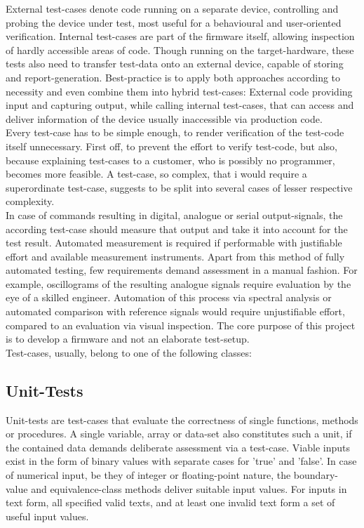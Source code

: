 	External test-cases denote code running on a separate device, controlling and probing the device under test, most useful for a behavioural and user-oriented verification. Internal test-cases are part of the firmware itself, allowing inspection of hardly accessible areas of code. Though running on the target-hardware, these tests also need to transfer test-data onto an external device, capable of storing and report-generation. Best-practice is to apply both approaches according to necessity and even combine them into hybrid test-cases: External code providing input and capturing output, while calling internal test-cases, that can access and deliver information of the device usually inaccessible via production code. \\
	
	Every test-case has to be simple enough, to render verification of the test-code itself unnecessary. First off, to prevent the effort to verify test-code, but also, because explaining test-cases to a customer, who is possibly no programmer, becomes more feasible. A test-case, so complex, that i would require a superordinate test-case, suggests to be split into several cases of lesser respective complexity. \\
			
	In case of commands resulting in digital, analogue or serial output-signals, the according test-case should measure that output and take it into account for the test result. Automated measurement is required if performable with justifiable effort and available measurement instruments. Apart from this method of fully automated testing, few requirements demand assessment in a manual fashion. For example, oscillograms of the resulting analogue signals require evaluation by the eye of a skilled engineer. Automation of this process via spectral analysis or automated comparison with reference signals would require unjustifiable effort, compared to an evaluation via visual inspection. 
	The core purpose of this project is to develop a firmware and not an elaborate test-setup. \\

	Test-cases, usually, belong to one of the following classes: %
	\subsection{Unit-Tests}
		Unit-tests are test-cases that evaluate the correctness of single functions, methods or procedures. A single variable, array or data-set also constitutes such a unit, if the contained data demands deliberate assessment via a test-case. Viable inputs exist in the form of binary values with separate cases for 'true' and 'false'. In case of numerical input, be they of integer or floating-point nature, the boundary-value and equivalence-class methods deliver suitable input values. For inputs in text form, all specified valid texts, and at least one invalid text form a set of useful input values. \cite{jorgensen13}
